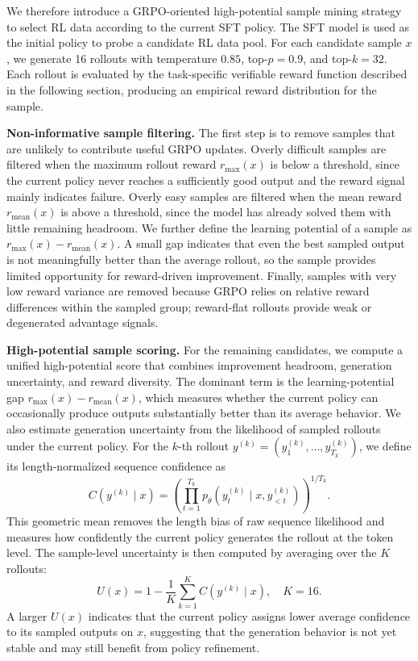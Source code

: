 \documentclass[11pt, a4paper,logo,  copyright, nonumbering]{paddleocr}
\begin{document}
We therefore introduce a GRPO-oriented high-potential sample mining strategy to select RL data according to the current SFT policy. The SFT model is used as the initial policy to probe a candidate RL data pool. For each candidate sample \(x\), we generate 16 rollouts with temperature \(0.85\), top-\(p=0.9\), and top-\(k=32\). Each rollout is evaluated by the task-specific verifiable reward function described in the following section, producing an empirical reward distribution for the sample.

\textbf{Non-informative sample filtering.} The first step is to remove samples that are unlikely to contribute useful GRPO updates. Overly difficult samples are filtered when the maximum rollout reward \(r_{\max}(x)\) is below a threshold, since the current policy never reaches a sufficiently good output and the reward signal mainly indicates failure. Overly easy samples are filtered when the mean reward \(r_{\mathrm{mean}}(x)\) is above a threshold, since the model has already solved them with little remaining headroom. We further define the learning potential of a sample as \(r_{\max}(x)-r_{\mathrm{mean}}(x)\). A small gap indicates that even the best sampled output is not meaningfully better than the average rollout, so the sample provides limited opportunity for reward-driven improvement. Finally, samples with very low reward variance are removed because GRPO relies on relative reward differences within the sampled group; reward-flat rollouts provide weak or degenerated advantage signals.

\textbf{High-potential sample scoring.} For the remaining candidates, we compute a unified high-potential score that combines improvement headroom, generation uncertainty, and reward diversity. The dominant term is the learning-potential gap \(r_{\max}(x)-r_{\mathrm{mean}}(x)\), which measures whether the current policy can occasionally produce outputs substantially better than its average behavior. We also estimate generation uncertainty from the likelihood of sampled rollouts under the current policy. For the \(k\)-th rollout \(y^{(k)}=(y^{(k)}_1,\ldots,y^{(k)}_{T_k})\), we define its length-normalized sequence confidence as
\begin{equation}
C\left(y^{(k)} \mid x\right)
=
\left(
\prod_{t=1}^{T_k}
p_{\theta}\left(y^{(k)}_t \mid x, y^{(k)}_{<t}\right)
\right)^{1/T_k}.
\end{equation}
This geometric mean removes the length bias of raw sequence likelihood and measures how confidently the current policy generates the rollout at the token level. The sample-level uncertainty is then computed by averaging over the \(K\) rollouts:
\begin{equation}
U(x)
=
1 -
\frac{1}{K}
\sum_{k=1}^{K}
C\left(y^{(k)} \mid x\right),
\quad K=16.
\end{equation}
A larger \(U(x)\) indicates that the current policy assigns lower average confidence to its sampled outputs on \(x\), suggesting that the generation behavior is not yet stable and may still benefit from policy refinement.
\end{document}
